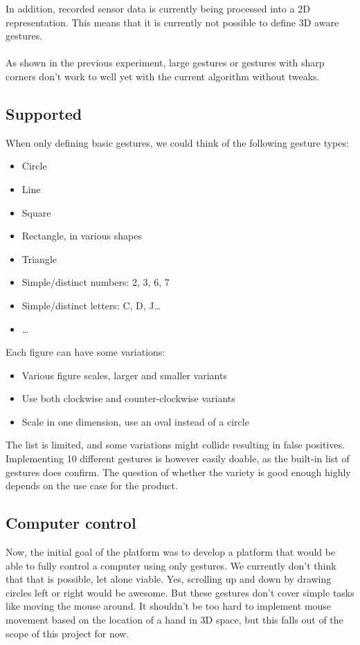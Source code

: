 \documentclass[a4paper]{article}
\providecommand{\tightlist}{%
\setlength{\itemsep}{0pt}\setlength{\parskip}{0pt}}
\begin{document}
  In addition, recorded sensor data is currently being processed into a 2D
  representation. This means that it is currently not possible to define 3D
  aware gestures.

  \paragraph{}
  As shown in the previous experiment, large gestures or gestures with sharp
  corners don't work to well yet with the current algorithm without tweaks.

  \subsection*{Supported}
  When only defining basic gestures, we could think of the following gesture
  types:

  \begin{itemize}
    \tightlist
    \item Circle
    \item Line
    \item Square
    \item Rectangle, in various shapes
    \item Triangle
    \item Simple/distinct numbers: 2, 3, 6, 7
    \item Simple/distinct letters: C, D, J\dots
    \item \dots
  \end{itemize}

  Each figure can have some variations:
  \begin{itemize}
    \tightlist
    \item Various figure scales, larger and smaller variants
    \item Use both clockwise and counter-clockwise variants
    \item Scale in one dimension, use an oval instead of a circle
  \end{itemize}

  The list is limited, and some variations might collide resulting in false
  positives. Implementing 10 different gestures is however easily doable, as the
  built-in list of gestures does confirm. The question of whether the variety is
  good enough highly depends on the use case for the product.

  \subsection*{Computer control}
  Now, the initial goal of the platform was to develop a platform that would be
  able to fully control a computer using only gestures. We currently don't think
  that that is possible, let alone viable.
  Yes, scrolling up and down by drawing circles left or right would be awesome.
  But these gestures don't cover simple tasks like moving the mouse around.
  It shouldn't be too hard to implement mouse movement based on the location of
  a hand in 3D space, but this falls out of the scope of this project for now.
\end{document}
